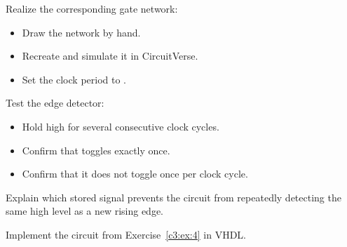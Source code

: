 \begin{parts}
  \item Realize the corresponding gate network:
    \begin{itemize}
      \item Draw the network by hand.
      \item Recreate and simulate it in CircuitVerse.
      \item Set the clock period to .
    \end{itemize}
  \item Test the edge detector:
    \begin{itemize}
      \item Hold  high for several consecutive clock cycles.
      \item Confirm that  toggles exactly once.
      \item Confirm that it does not toggle once per clock cycle.
    \end{itemize}
    Explain which stored signal prevents the circuit from repeatedly detecting the same high level
    as a new rising edge.
\end{parts}

\label{c3:ex:5}
Implement the circuit from Exercise~\ref{c3:ex:4} in VHDL.

